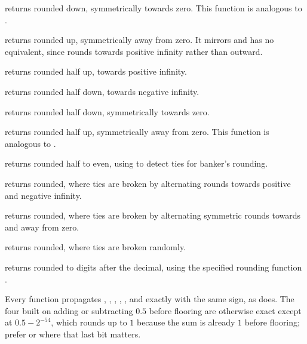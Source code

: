 \begin{compactitem}
  \item {} returns  rounded down, symmetrically towards zero. This function is analogous to .
  \item {} returns  rounded up, symmetrically away from zero. It mirrors  and has no  equivalent, since  rounds towards positive infinity rather than outward.
  \item {} returns  rounded half up, towards positive infinity.
  \item {} returns  rounded half down, towards negative infinity.
  \item {} returns  rounded half down, symmetrically towards zero.
  \item {} returns  rounded half up, symmetrically away from zero. This function is analogous to .
  \item {} returns  rounded half to even, using  to detect ties for banker's rounding.
  \item {} returns  rounded, where ties are broken by alternating rounds towards positive and negative infinity.
  \item {} returns  rounded, where ties are broken by alternating symmetric rounds towards and away from zero.
  \item {} returns  rounded, where ties are broken randomly.
  \item {} returns  rounded to  digits after the decimal, using the specified rounding function .
\end{compactitem}

Every function propagates , , , , , and  exactly with the same sign, as  does. The four built on adding or subtracting $0.5$ before flooring are otherwise exact except at $0.5 - 2^{-54}$, which rounds up to $1$ because the sum is already $1$ before flooring; prefer  or  where that last bit matters.

